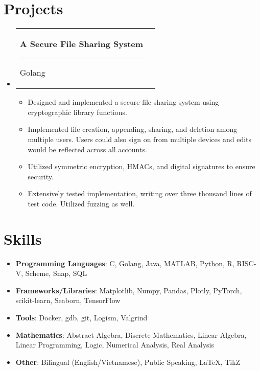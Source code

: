 \documentclass[letterpaper,11pt]{article}
\makeatletter
\newcommand{\resumeItem}[2]{
	\item\small{
		\textbf{#1}{: #2 \vspace{-2pt}}
	}
}
\newcommand{\resumeItemTwo}[1]{
	\item\small{
		#1 \vspace{-2pt}}
}
\newcommand{\resumeSubheadingTwo}[2]{
	\vspace{-1pt}\item
	\begin{tabular*}{0.97\textwidth}[t]{l@{\extracolsep{\fill}}r}
		\textbf{#1} \rule[-0.4ex]{0.1ex}{1.2em} #2 \\
	\end{tabular*}\vspace{-5pt}
}
\newcommand{\resumeSubItem}[2]{\resumeItem{#1}{#2}\vspace{-4pt}}
\newcommand{\resumeSubHeadingListStart}{\begin{itemize}[leftmargin=*]}
\newcommand{\resumeSubHeadingListEnd}{\end{itemize}}
\newcommand{\resumeItemListStart}{\begin{itemize}}
\newcommand{\resumeItemListEnd}{\end{itemize}\vspace{-5pt}}
\makeatother
\begin{document}
	\section{Projects}
	\resumeSubHeadingListStart
	
	\resumeSubheadingTwo
	{A Secure File Sharing System}{Golang}
	\resumeItemListStart
	\resumeItemTwo{Designed and implemented a secure file sharing system using cryptographic library functions.}
	\resumeItemTwo{Implemented file creation, appending, sharing, and deletion among multiple users. Users could also sign on from multiple devices and edits would be reflected across all accounts.}
	\resumeItemTwo{Utilized symmetric encryption, HMACs, and digital signatures to ensure security.}
	\resumeItemTwo{Extensively tested implementation, writing over three thousand lines of test code. Utilized fuzzing as well.}
	\resumeItemListEnd
	\resumeSubHeadingListEnd

	\section{Skills}
	\resumeSubHeadingListStart
	\resumeSubItem{Programming Languages}
	{C, Golang, Java, MATLAB, Python, R, RISC-V, Scheme, Snap, SQL}
	\resumeSubItem{Frameworks/Libraries}{Matplotlib, Numpy, Pandas, Plotly, PyTorch, scikit-learn, Seaborn, TensorFlow}
	\resumeSubItem{Tools}{Docker, gdb, git, Logism, Valgrind}
	\resumeSubItem{Mathematics}{Abstract Algebra, Discrete Mathematics, Linear Algebra, Linear Programming, Logic, Numerical Analysis, Real Analysis}
	\resumeItem{Other}{Bilingual (English/Vietnamese), Public Speaking, LaTeX, TikZ}
	\resumeSubHeadingListEnd
\end{document}
